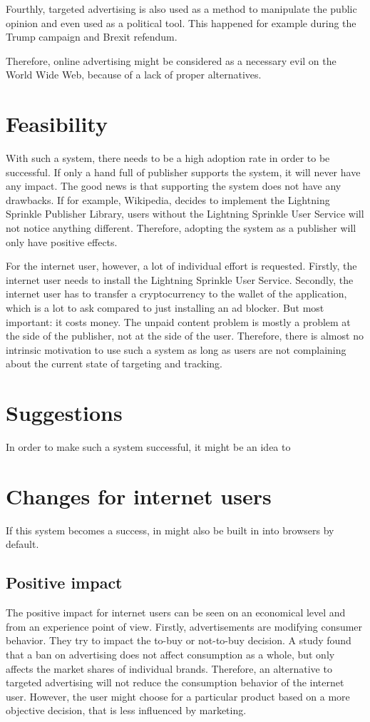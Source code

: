 Fourthly, targeted advertising is also used as a method to manipulate the public opinion and even used as a political tool. This happened for example during the Trump campaign and Brexit refendum\cite{cadwalladr2018cambridge}.

Therefore, online advertising might be considered as a necessary evil on the World Wide Web, because of a lack of proper alternatives.

\section{Feasibility}
With such a system, there needs to be a high adoption rate in order to be successful. If only a hand full of publisher supports the system, it will never have any impact. The good news is that supporting the system does not have any drawbacks. If for example, Wikipedia, decides to implement the Lightning Sprinkle Publisher Library, users without the Lightning Sprinkle User Service will not notice anything different. Therefore, adopting the system as a publisher will only have positive effects.

For the internet user, however, a lot of individual effort is requested. Firstly, the internet user needs to install the Lightning Sprinkle User Service. Secondly, the internet user has to transfer a cryptocurrency to the wallet of the application, which is a lot to ask compared to just installing an ad blocker. 
But most important: it costs money. The unpaid content problem is mostly a problem at the side of the publisher, not at the side of the user. Therefore, there is almost no intrinsic motivation to use such a system as long as users are not complaining about the current state of targeting and tracking. 

\section{Suggestions}
In order to make such a system successful, it might be an idea to 


\section{Changes for internet users}
If this system becomes a success, in might also be built in into browsers by default. 

\subsection{Positive impact}
The positive impact for internet users can be seen on an economical level and from an experience point of view. Firstly, advertisements are modifying consumer behavior. They try to impact the to-buy or not-to-buy decision\cite{johnson2007consumer}. A study found that a ban on advertising does not affect consumption as a whole, but only affects the market shares of individual brands\cite{advertisementsconsumption}. Therefore, an alternative to targeted advertising will not reduce the consumption behavior of the internet user. However, the user might choose for a particular product based on a more objective decision, that is less influenced by marketing.

